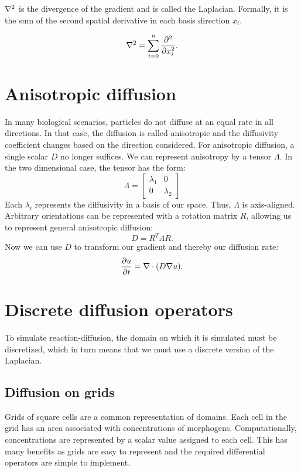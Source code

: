 $\nabla^2$ is the divergence of the gradient and is called the Laplacian. Formally, it is the sum of the second spatial derivative in each basis direction $x_i$.

\begin{equation}
\label{eq:laplacian}
	\nabla^2 = \sum_{i=0}^{n} \frac{\partial^2}{\partial x_i^2}.
\end{equation}
	
\section{Anisotropic diffusion}
In many biological scenarios, particles do not diffuse at an equal rate in all directions. In that case, the diffusion is called anisotropic and the diffusivity coefficient changes based on the direction considered. For anisotropic diffusion, a single scalar $D$ no longer suffices. We can represent anisotropy by a tensor $\Lambda$. In the two dimensional case, the tensor has the form:
\[\Lambda =
\begin{bmatrix}
    \lambda_1 & 0 \\
    0 & \lambda_2 
\end{bmatrix}\]
Each $\lambda_i$ represents the diffusivity in a basis of our space. Thus, $\Lambda$ is axis-aligned. Arbitrary orientations can be represented with a rotation matrix $R$, allowing us to represent general anisotropic diffusion:
\[D = R^T \Lambda R.\]
Now we can use $D$ to transform our gradient and thereby our diffusion rate:
\begin{equation}
\label{eq:anisoLap}
	\frac{\partial u}{\partial t} = \nabla \cdot (D \nabla u).
\end{equation}
\section{Discrete diffusion operators}
To simulate reaction-diffusion, the domain on which it is simulated must be discretized, which in turn means that we must use a discrete version of the Laplacian.

\subsection{Diffusion on grids}
Grids of square cells are a common representation of domains. Each cell in the grid has an area associated with concentrations of morphogens. Computationally, concentrations are represented by a scalar value assigned to each cell. This has many benefits as grids are easy to represent and the required differential operators are simple to implement.

